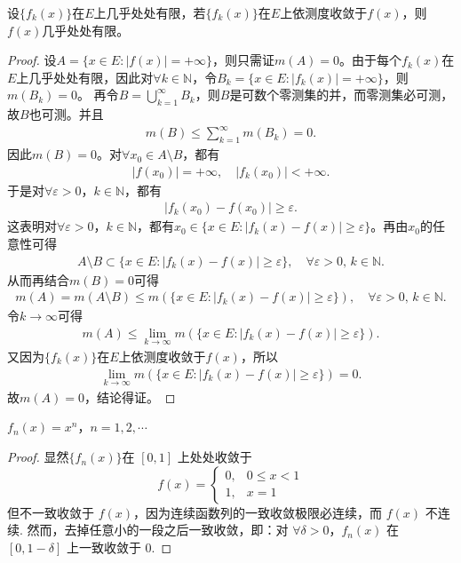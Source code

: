 \documentclass[../../main.tex]{subfiles}%
\begin{document}
\begin{theorem}\label{theorem:依测度收敛的极限函数必几乎处处有限}
设\(\{f_k(x)\}\)在\(E\)上几乎处处有限，若\(\{f_k(x)\}\)在\(E\)上依测度收敛于\(f(x)\)，则\(f(x)\)几乎处处有限。
\end{theorem}
\begin{proof}
设\(A = \{x \in E : |f(x)| = +\infty\}\)，则只需证\(m(A) = 0\)。由于每个\(f_k(x)\)在\(E\)上几乎处处有限，因此对\(\forall k \in \mathbb{N}\)，令\(B_k = \{x \in E : |f_k(x)| = +\infty\}\)，则\(m(B_k) = 0\)。
再令\(B = \bigcup_{k=1}^{\infty} B_k\)，则\(B\)是可数个零测集的并，而零测集必可测，故\(B\)也可测。并且
\begin{align*}
m(B) \leqslant \sum_{k=1}^{\infty} m(B_k) = 0.
\end{align*}
因此\(m(B) = 0\)。对\(\forall x_0 \in A \setminus B\)，都有
\begin{align*}
|f(x_0)| = +\infty, \quad |f_k(x_0)| < +\infty.
\end{align*}
于是对\(\forall \varepsilon > 0\)，\(k \in \mathbb{N}\)，都有
\begin{align*}
|f_k(x_0) - f(x_0)| \geqslant \varepsilon.
\end{align*}
这表明对\(\forall \varepsilon > 0\)，\(k \in \mathbb{N}\)，都有\(x_0 \in \{x \in E : |f_k(x) - f(x)| \geqslant \varepsilon\}\)。再由\(x_0\)的任意性可得
\begin{align*}
A \setminus B \subset \{x \in E : |f_k(x) - f(x)| \geqslant \varepsilon\}, \quad \forall \varepsilon > 0, \, k \in \mathbb{N}.
\end{align*}
从而再结合\(m(B) = 0\)可得
\begin{align*}
m(A) = m(A \setminus B) \leqslant m(\{x \in E : |f_k(x) - f(x)| \geqslant \varepsilon\}), \quad \forall \varepsilon > 0, \, k \in \mathbb{N}.
\end{align*}
令\(k \to \infty\)可得
\begin{align*}
m(A) \leqslant \lim_{k \to \infty} m(\{x \in E : |f_k(x) - f(x)| \geqslant \varepsilon\}).
\end{align*}
又因为\(\{f_k(x)\}\)在\(E\)上依测度收敛于\(f(x)\)，所以
\begin{align*}
\lim_{k \to \infty} m(\{x \in E : |f_k(x) - f(x)| \geqslant \varepsilon\}) = 0.
\end{align*}
故\(m(A) = 0\)，结论得证。
\end{proof}

\begin{example}[收敛但不一致收敛的函数]

$f_n(x)=x^n$，$n = 1,2,\cdots$ 
\end{example}
\begin{proof}
显然$\{f_n(x)\}$在 $[0,1]$ 上处处收敛于
\[
f(x)=
\begin{cases}
0, & 0\leqslant x<1 \\
1, & x = 1
\end{cases}
\]
但不一致收敛于 $f(x)$，因为连续函数列的一致收敛极限必连续，而 $f(x)$ 不连续. 然而，去掉任意小的一段之后一致收敛，即：对 $\forall\delta>0$，$f_n(x)$ 在 $[0,1 - \delta]$ 上一致收敛于 $0$.
\end{proof}
\end{document}
